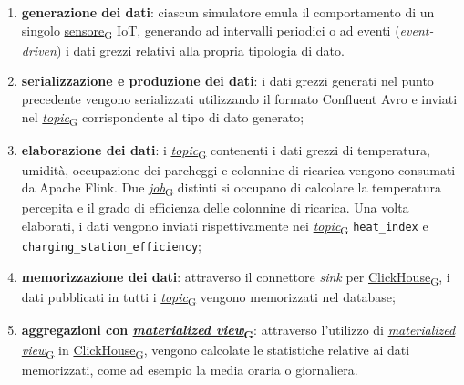 \begin{enumerate}
	\item \textbf{generazione dei dati}: ciascun simulatore emula il comportamento di un singolo \href{https://7last.github.io/docs/pb/documentazione-interna/glossario\#sensore}{sensore\textsubscript{G}} IoT, generando ad intervalli periodici o ad eventi (\textit{event-driven}) i dati grezzi relativi alla propria tipologia di dato.
	\item \textbf{serializzazione e produzione dei dati}: i dati grezzi generati nel punto precedente vengono serializzati utilizzando il formato Confluent Avro e inviati nel \href{https://7last.github.io/docs/pb/documentazione-interna/glossario\#topic}{\textit{topic}\textsubscript{G}} corrispondente al tipo di dato generato;
	\item \textbf{elaborazione dei dati}: i \href{https://7last.github.io/docs/pb/documentazione-interna/glossario\#topic}{\textit{topic}\textsubscript{G}} contenenti i dati grezzi di temperatura, umidità, occupazione dei parcheggi e colonnine di ricarica vengono consumati da Apache Flink.
	      Due \href{https://7last.github.io/docs/pb/documentazione-interna/glossario\#job}{\textit{job}\textsubscript{G}} distinti si occupano di calcolare la temperatura percepita e il grado di efficienza delle colonnine di ricarica. Una volta elaborati, i dati vengono inviati rispettivamente
	      nei \href{https://7last.github.io/docs/pb/documentazione-interna/glossario\#topic}{\textit{topic}\textsubscript{G}} \texttt{heat\_index} e \texttt{charging\_station\_efficiency};
	\item \textbf{memorizzazione dei dati}: attraverso il connettore \textit{sink} per \href{https://7last.github.io/docs/pb/documentazione-interna/glossario\#clickhouse}{ClickHouse\textsubscript{G}}, i dati pubblicati in tutti i \href{https://7last.github.io/docs/pb/documentazione-interna/glossario\#topic}{\textit{topic}\textsubscript{G}} vengono memorizzati nel database;
	\item \textbf{aggregazioni con \href{https://7last.github.io/docs/pb/documentazione-interna/glossario\#materialized-view}{\textit{materialized view}\textsubscript{G}}}: attraverso l'utilizzo di \href{https://7last.github.io/docs/pb/documentazione-interna/glossario\#materialized-view}{\textit{materialized view}\textsubscript{G}} in \href{https://7last.github.io/docs/pb/documentazione-interna/glossario\#clickhouse}{ClickHouse\textsubscript{G}}, vengono calcolate le statistiche relative ai dati memorizzati, come ad esempio la media oraria o giornaliera.

\end{enumerate}

